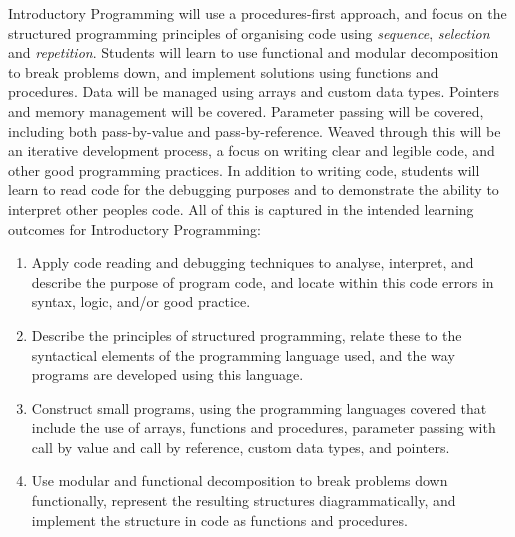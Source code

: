 Introductory Programming will use a procedures-first approach, and focus on the structured programming principles of organising code using \emph{sequence}, \emph{selection} and \emph{repetition}. Students will learn to use functional and modular decomposition to break problems down, and implement solutions using functions and procedures. Data will be managed using arrays and custom data types. Pointers and memory management will be covered. Parameter passing will be covered, including both pass-by-value and pass-by-reference. Weaved through this will be an iterative development process, a focus on writing clear and legible code, and other good programming practices. In addition to writing code, students will learn to read code for the debugging purposes and to demonstrate the ability to interpret other peoples code. All of this is captured in the intended learning outcomes for Introductory Programming:
\begin{enumerate}
	\item Apply code reading and debugging techniques to analyse, interpret, and describe the purpose of program code, and locate within this code errors in syntax, logic, and/or good practice.
	\item Describe the principles of structured programming, relate these to the syntactical elements of the programming language used, and the way programs are developed using this language.
	\item Construct small programs, using the programming languages covered that include the use of arrays, functions and procedures, parameter passing with call by value and call by reference, custom data types, and pointers.
	\item Use modular and functional decomposition to break problems down functionally, represent the resulting structures diagrammatically, and implement the structure in code as functions and procedures.
\end{enumerate}

